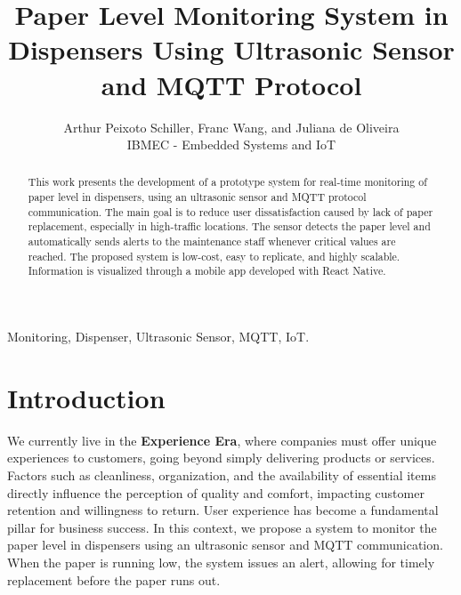 \documentclass[english,hidelinks]{sbrt}
\begin{document}
\title{Paper Level Monitoring System in Dispensers Using Ultrasonic Sensor and MQTT Protocol}
\author{Arthur Peixoto Schiller, Franc Wang, and Juliana de Oliveira\\IBMEC - Embedded Systems and IoT}
\maketitle


\begin{abstract}
This work presents the development of a prototype system for real-time monitoring of paper level in dispensers, using an ultrasonic sensor and MQTT protocol communication. The main goal is to reduce user dissatisfaction caused by lack of paper replacement, especially in high-traffic locations. The sensor detects the paper level and automatically sends alerts to the maintenance staff whenever critical values are reached. The proposed system is low-cost, easy to replicate, and highly scalable. Information is visualized through a mobile app developed with React Native.
\end{abstract}
\begin{keywords}
Monitoring, Dispenser, Ultrasonic Sensor, MQTT, IoT.
\end{keywords}

\section{Introduction}
We currently live in the \textbf{Experience Era}, where companies must offer unique experiences to customers, going beyond simply delivering products or services. Factors such as cleanliness, organization, and the availability of essential items directly influence the perception of quality and comfort, impacting customer retention and willingness to return. User experience has become a fundamental pillar for business success. In this context, we propose a system to monitor the paper level in dispensers using an ultrasonic sensor and MQTT communication. When the paper is running low, the system issues an alert, allowing for timely replacement before the paper runs out.
\end{document}
